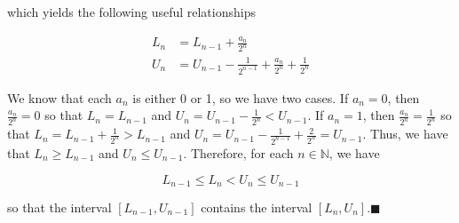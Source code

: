 \documentclass[paper=a4, fontsize=11pt]{scrartcl} %
\numberwithin{equation}{section} %
\numberwithin{figure}{section} %
\numberwithin{table}{section} %
\begin{document}
which yields the following useful relationships

\begin{align*}
L_n &= L_{n-1} + \frac{a_n}{2^n} \\
U_n &= U_{n-1} - \frac{1}{2^{n-1}} + \frac{a_n}{2^n} + \frac{1}{2^n}
\end{align*}

We know that each $a_n$ is either 0 or 1, so we have two cases. If $a_n = 0$, then $\frac{a_n}{2^n} = 0$ so that $L_n = L_{n-1}$ and $U_n = U_{n-1} - \frac{1}{2^n} < U_{n-1}$. If $a_n = 1$, then $\frac{a_n}{2^n} = \frac{1}{2^n}$ so that $L_n = L_{n-1} + \frac{1}{2^n} > L_{n-1}$ and $U_n = U_{n-1} - \frac{1}{2^{n-1}} + \frac{2}{2^n} = U_{n-1}$. Thus, we have that $L_n \geq L_{n-1}$ and $U_n \leq U_{n-1}$. Therefore, for each $n \in \mathbb{N}$, we have

\begin{equation}
L_{n-1} \leq L_n < U_n \leq U_{n-1}
\end{equation}

so that the interval $[L_{n-1},U_{n-1}]$ contains the interval $[L_n,U_n]$.$\blacksquare$\\
\end{document}
